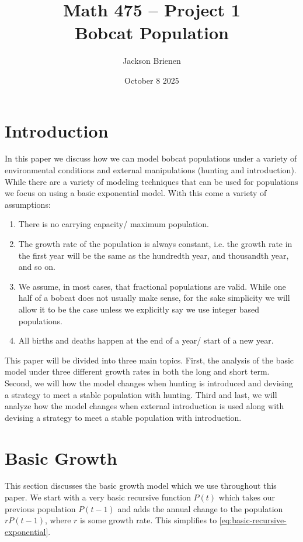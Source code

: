\documentclass{article}
\title{Math 475 -- Project 1 \\ Bobcat Population}
\author{Jackson Brienen}
\date{October 8 2025}
\begin{document}
\maketitle

\section{Introduction}
In this paper we discuss how we can model bobcat populations under a variety of environmental conditions and external manipulations (hunting and introduction). While there are a variety of modeling techniques that can be used for populations we focus on using a basic exponential model. With this come a variety of assumptions:

\begin{enumerate}
    \item There is no carrying capacity/ maximum population.
    \item The growth rate of the population is always constant, i.e. the growth rate in the first year will be the same as the hundredth year, and thousandth year, and so on.
    \item We assume, in most cases, that fractional populations are valid. While one half of a bobcat does not usually make sense, for the sake simplicity we will allow it to be the case unless we explicitly say we use integer based populations.
    \item All births and deaths happen at the end of a year/ start of a new year.
\end{enumerate}

This paper will be divided into three main topics. First, the analysis of the basic model under three different growth rates in both the long and short term. Second, we will how the model changes when hunting is introduced and devising a strategy to meet a stable population with hunting. Third and last, we will analyze how the model changes when external introduction is used along with devising a strategy to meet a stable population with introduction.


\section{Basic Growth}
This section discusses the basic growth model which we use throughout this paper. We start with a very basic recursive function $P(t)$ which takes our previous population $P(t-1)$ and adds the annual change to the population $rP(t-1)$, where $r$ is some growth rate. This simplifies to \autoref{eq:basic-recursive-exponential}.
\end{document}
